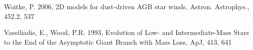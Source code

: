 \documentclass[a4paper,11pt]{article}
\newcommand{\fig}[1]{\centerline{\texttt{[image: \#1]}}}
\begin{document}
\begin{thebibliography}{9}
    Woitke, P. 2006, 2D models for dust-driven AGB star winds, Astron. Astrophys., 452.2, 537
    
    






    Vassiliadis, E., Wood, P.R. 1993, Evolution of Low- and Intermediate-Mass Stars to the End of the Asymptotic Giant Branch with Mass Loss, ApJ, 413, 641


\end{thebibliography}
\end{document}
